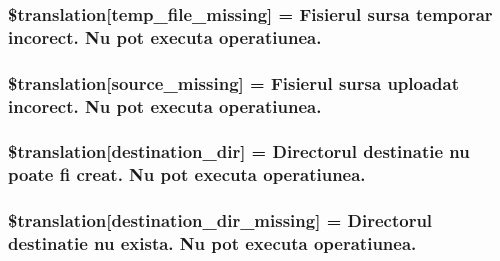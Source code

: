 \subsubsection[{\$translation}]{\setlength{\rightskip}{0pt plus 5cm}\$translation\mbox{[}\textquotesingle{}temp\+\_\+file\+\_\+missing\textquotesingle{}\mbox{]} = \textquotesingle{}Fisierul sursa temporar incorect. Nu pot executa operatiunea.\textquotesingle{}}\label{class_8upload_8ro___r_o_8php_ab0fa87a88aba2624004581eed0633325}
\hypertarget{class_8upload_8ro___r_o_8php_aceaaf7355acaaf10f0ae60378d03c468}{}
\subsubsection[{\$translation}]{\setlength{\rightskip}{0pt plus 5cm}\$translation\mbox{[}\textquotesingle{}source\+\_\+missing\textquotesingle{}\mbox{]} = \textquotesingle{}Fisierul sursa uploadat incorect. Nu pot executa operatiunea.\textquotesingle{}}\label{class_8upload_8ro___r_o_8php_aceaaf7355acaaf10f0ae60378d03c468}
\hypertarget{class_8upload_8ro___r_o_8php_aff2427c72a2598aefa6d58df1dd18b08}{}
\subsubsection[{\$translation}]{\setlength{\rightskip}{0pt plus 5cm}\$translation\mbox{[}\textquotesingle{}destination\+\_\+dir\textquotesingle{}\mbox{]} = \textquotesingle{}Directorul destinatie nu poate fi creat. Nu pot executa operatiunea.\textquotesingle{}}\label{class_8upload_8ro___r_o_8php_aff2427c72a2598aefa6d58df1dd18b08}
\hypertarget{class_8upload_8ro___r_o_8php_a9ef28d3cf09942c6c0a1e77fa09185e8}{}
\subsubsection[{\$translation}]{\setlength{\rightskip}{0pt plus 5cm}\$translation\mbox{[}\textquotesingle{}destination\+\_\+dir\+\_\+missing\textquotesingle{}\mbox{]} = \textquotesingle{}Directorul destinatie nu exista. Nu pot executa operatiunea.\textquotesingle{}}\label{class_8upload_8ro___r_o_8php_a9ef28d3cf09942c6c0a1e77fa09185e8}
\hypertarget{class_8upload_8ro___r_o_8php_a5704a67137126e8c87b7a364175929d4}{}
